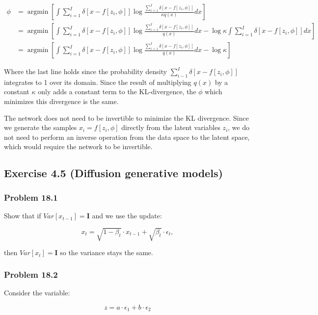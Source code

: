 \documentclass[
10pt, %
a4paper, %
oneside, %
headinclude,footinclude, %
BCOR5mm, %
]{scrartcl}
\DeclareMathOperator*{\argmin}{argmin} %
\begin{document}
\begin{align*}
  \phi &= \argmin \left[ \int \sum_{i=1}^I \delta[x-f[z_i,\phi]] \log \frac{\sum_{i=1}^I \delta[x-f[z_i,\phi]]}{\kappa q(x)} dx \right] \\
  &= \argmin \left[ \int \sum_{i=1}^I \delta[x-f[z_i,\phi]] \log \frac{\sum_{i=1}^I \delta[x-f[z_i,\phi]]}{q(x)} dx - \log \kappa \int \sum_{i=1}^I \delta[x-f[z_i,\phi]] dx \right] \\
  &= \argmin \left[ \int \sum_{i=1}^I \delta[x-f[z_i,\phi]] \log \frac{\sum_{i=1}^I \delta[x-f[z_i,\phi]]}{q(x)} dx - \log \kappa \right]
\end{align*}

Where the last line holds since the probability density $\sum_{i-1}^I \delta[x-f[z_i,\phi]]$ integrates to 1 over its domain. Since the result of multiplying $q(x)$ by a constant $\kappa$ only adds a constant term to the KL-divergence, the $\phi$ which minimizes this divergence is the same.

The network does not need to be invertible to minimize the KL divergence. Since we generate the samples $x_i = f[z_i , \phi]$ directly from the latent variables $z_i$, we do not need to perform an inverse operation from the data space to the latent space, which would require the network to be invertible.

\subsection*{Exercise 4.5 (Diffusion generative models)}

\subsubsection*{Problem 18.1}

Show that if $Var[x_{t-1}] = \textbf{I}$ and we use the update:

\begin{equation*}
  x_t = \sqrt{1-\beta_t}\cdot x_{t-1} + \sqrt{\beta_t} \cdot \epsilon_t,
\end{equation*}

then $Var[x_t] = \textbf{I}$ so the variance stays the same.

\subsubsection*{Problem 18.2}

Consider the variable:

$$z = a \cdot \epsilon_1 + b \cdot \epsilon_2$$
\end{document}
